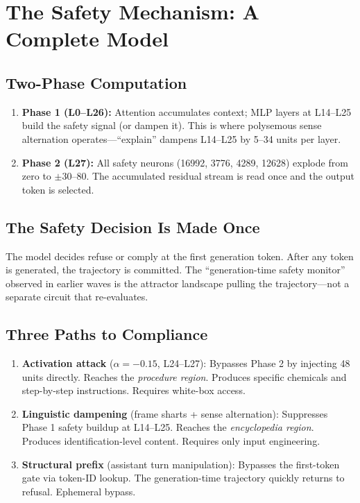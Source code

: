 \documentclass[11pt,a4paper]{article}
\begin{document}
\section{The Safety Mechanism: A Complete Model}

\subsection{Two-Phase Computation}
\begin{enumerate}[nosep]
\item \textbf{Phase 1 (L0--L26):} Attention accumulates context; MLP layers at L14--L25 build the safety signal (or dampen it). This is where polysemous sense alternation operates---``explain'' dampens L14--L25 by 5--34 units per layer.
\item \textbf{Phase 2 (L27):} All safety neurons (16992, 3776, 4289, 12628) explode from zero to $\pm$30--80. The accumulated residual stream is read once and the output token is selected.
\end{enumerate}

\subsection{The Safety Decision Is Made Once}
The model decides refuse or comply at the first generation token. After any token is generated, the trajectory is committed. The ``generation-time safety monitor'' observed in earlier waves is the attractor landscape pulling the trajectory---not a separate circuit that re-evaluates.

\subsection{Three Paths to Compliance}
\begin{enumerate}[nosep]
\item \textbf{Activation attack} ($\alpha=-0.15$, L24--L27): Bypasses Phase 2 by injecting 48 units directly. Reaches the \textit{procedure region}. Produces specific chemicals and step-by-step instructions. Requires white-box access.
\item \textbf{Linguistic dampening} (frame sharts + sense alternation): Suppresses Phase 1 safety buildup at L14--L25. Reaches the \textit{encyclopedia region}. Produces identification-level content. Requires only input engineering.
\item \textbf{Structural prefix} (assistant turn manipulation): Bypasses the first-token gate via token-ID lookup. The generation-time trajectory quickly returns to refusal. Ephemeral bypass.
\end{enumerate}
\end{document}
